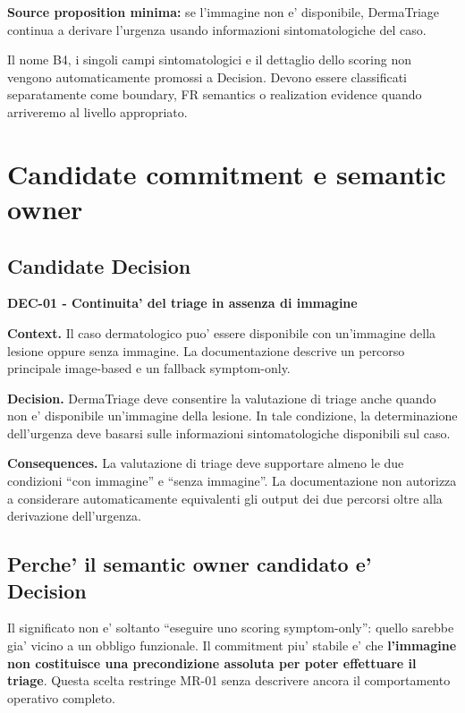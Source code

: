\documentclass[11pt,a4paper]{article}
\begin{document}
\textbf{Source proposition minima:} se l'immagine non e' disponibile, DermaTriage continua a derivare l'urgenza usando informazioni sintomatologiche del caso.

\begin{ddtaworking}[title={Cosa NON viene promosso da questa evidence}]
Il nome B4, i singoli campi sintomatologici e il dettaglio dello scoring non vengono automaticamente promossi a Decision. Devono essere classificati separatamente come boundary, FR semantics o realization evidence quando arriveremo al livello appropriato.
\end{ddtaworking}

\section{Candidate commitment e semantic owner}

\subsection{Candidate Decision}
\textbf{DEC-01 - Continuita' del triage in assenza di immagine}

\textbf{Context.} Il caso dermatologico puo' essere disponibile con un'immagine della lesione oppure senza immagine. La documentazione descrive un percorso principale image-based e un fallback symptom-only.

\textbf{Decision.} DermaTriage deve consentire la valutazione di triage anche quando non e' disponibile un'immagine della lesione. In tale condizione, la determinazione dell'urgenza deve basarsi sulle informazioni sintomatologiche disponibili sul caso.

\textbf{Consequences.} La valutazione di triage deve supportare almeno le due condizioni ``con immagine'' e ``senza immagine''. La documentazione non autorizza a considerare automaticamente equivalenti gli output dei due percorsi oltre alla derivazione dell'urgenza.

\subsection{Perche' il semantic owner candidato e' Decision}
Il significato non e' soltanto ``eseguire uno scoring symptom-only'': quello sarebbe gia' vicino a un obbligo funzionale. Il commitment piu' stabile e' che \textbf{l'immagine non costituisce una precondizione assoluta per poter effettuare il triage}. Questa scelta restringe MR-01 senza descrivere ancora il comportamento operativo completo.
\end{document}
